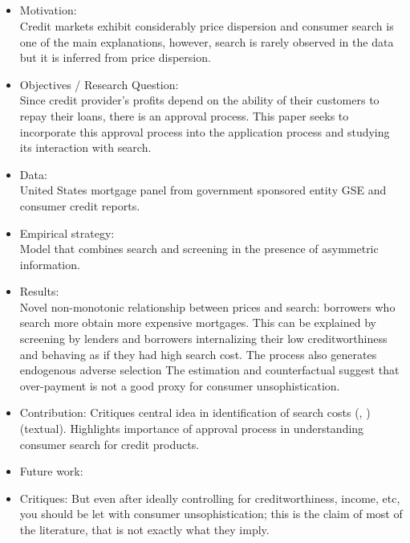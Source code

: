 \documentclass{article}
\theoremstyle{definition}
\begin{document}
\subsection*{\cite{agarwal2020searching}}
   \begin{itemize}
   \item Motivation: \\ Credit markets exhibit considerably price dispersion and consumer search is one of the main explanations, however, search is rarely observed in the data but it is inferred from price dispersion. 
    
    \item Objectives / Research Question:\\ Since credit provider's profits depend on the ability of their  customers to repay their loans, there is an approval process. This paper seeks to incorporate this approval process into the application process and studying its interaction with search. 
    
    \item Data: \\  United States mortgage panel from government sponsored entity GSE and consumer credit reports. 
    
    \item Empirical strategy: \\ Model that combines search and screening in the presence of asymmetric information.
    
    \item Results: \\  Novel non-monotonic relationship between prices and search: borrowers who search more obtain more expensive mortgages. This can be explained by screening by lenders and borrowers internalizing their low creditworthiness and behaving as if they had high search cost. The process also generates endogenous adverse selection  The estimation and counterfactual suggest that over-payment is not a good proxy for consumer unsophistication.
    
    \item Contribution: Critiques central idea in identification of search costs (\cite{hortaccsu2004product}, \cite{allen2014effect}) (textual). Highlights importance of approval process in understanding consumer search for credit products. 
    
    \item Future work: 
    
    \item Critiques: But even after ideally controlling for creditworthiness, income, etc, you should be let with consumer unsophistication; this is the claim of most of the literature, that is not exactly what they imply. 
    
    \end{itemize}
\end{document}
